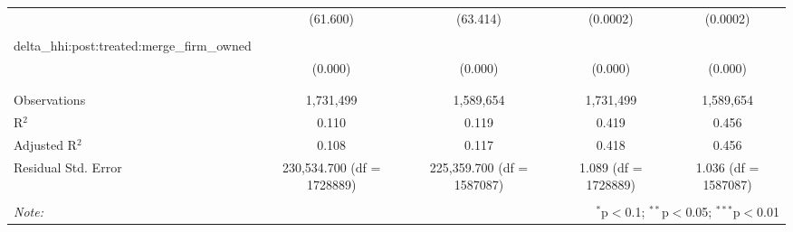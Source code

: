 \begin{table}[H]
{\begin{tabular}{@{\extracolsep{5pt}}lcccc}
   & (61.600) & (63.414) & (0.0002) & (0.0002) \\  

   & & & & \\  

  delta\_hhi:post:treated:merge\_firm\_owned &  &  &  &  \\  

   & (0.000) & (0.000) & (0.000) & (0.000) \\  

   & & & & \\  

 \hline \\[-1.8ex]  

 Observations & 1,731,499 & 1,589,654 & 1,731,499 & 1,589,654 \\  

 R$^{2}$ & 0.110 & 0.119 & 0.419 & 0.456 \\  

 Adjusted R$^{2}$ & 0.108 & 0.117 & 0.418 & 0.456 \\  

 Residual Std. Error & 230,534.700 (df = 1728889) & 225,359.700 (df = 1587087) & 1.089 (df = 1728889) & 1.036 (df = 1587087) \\  

 \hline  

 \hline \\[-1.8ex]  

 \textit{Note:}  & \multicolumn{4}{r}{$^{*}$p$<$0.1; $^{**}$p$<$0.05; $^{***}$p$<$0.01} \\  

 \end{tabular}}  

 \end{table}  

 



